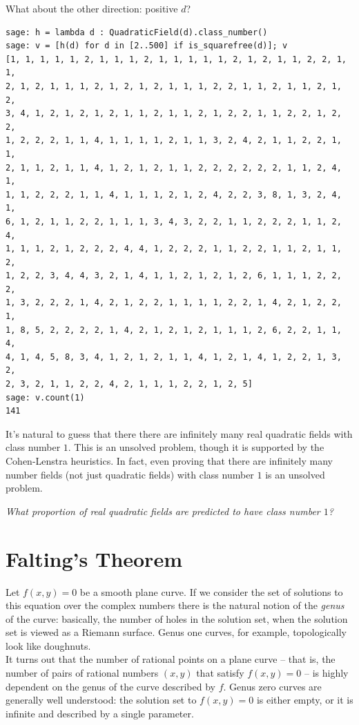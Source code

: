 \documentclass{book}
\theoremstyle{plain}
\theoremstyle{definition}
\numberwithin{equation}{section}
\numberwithin{figure}{section}
\numberwithin{table}{section}
\newcommand{\hw}[2]{\par\vspace{1em}{\bf HW (#1):} {\em #2}\par\vspace{1em}}
\begin{document}
What about the other direction: positive $d$?
\begin{lstlisting}
sage: h = lambda d : QuadraticField(d).class_number()
sage: v = [h(d) for d in [2..500] if is_squarefree(d)]; v
[1, 1, 1, 1, 1, 2, 1, 1, 1, 2, 1, 1, 1, 1, 1, 2, 1, 2, 1, 1, 2, 2, 1, 1,
2, 1, 2, 1, 1, 1, 2, 1, 2, 1, 2, 1, 1, 1, 2, 2, 1, 1, 2, 1, 1, 2, 1, 2,
3, 4, 1, 2, 1, 2, 1, 2, 1, 1, 2, 1, 1, 2, 1, 2, 2, 1, 1, 2, 2, 1, 2, 2,
1, 2, 2, 2, 1, 1, 4, 1, 1, 1, 1, 2, 1, 1, 3, 2, 4, 2, 1, 1, 2, 2, 1, 1,
2, 1, 1, 2, 1, 1, 4, 1, 2, 1, 2, 1, 1, 2, 2, 2, 2, 2, 2, 1, 1, 2, 4, 1,
1, 1, 2, 2, 2, 1, 1, 4, 1, 1, 1, 2, 1, 2, 4, 2, 2, 3, 8, 1, 3, 2, 4, 1,
6, 1, 2, 1, 1, 2, 2, 1, 1, 1, 3, 4, 3, 2, 2, 1, 1, 2, 2, 2, 1, 1, 2, 4,
1, 1, 1, 2, 1, 2, 2, 2, 4, 4, 1, 2, 2, 2, 1, 1, 2, 2, 1, 1, 2, 1, 1, 2,
1, 2, 2, 3, 4, 4, 3, 2, 1, 4, 1, 1, 2, 1, 2, 1, 2, 6, 1, 1, 1, 2, 2, 2,
1, 3, 2, 2, 2, 1, 4, 2, 1, 2, 2, 1, 1, 1, 1, 2, 2, 1, 4, 2, 1, 2, 2, 1,
1, 8, 5, 2, 2, 2, 2, 1, 4, 2, 1, 2, 1, 2, 1, 1, 1, 2, 6, 2, 2, 1, 1, 4,
4, 1, 4, 5, 8, 3, 4, 1, 2, 1, 2, 1, 1, 4, 1, 2, 1, 4, 1, 2, 2, 1, 3, 2,
2, 3, 2, 1, 1, 2, 2, 4, 2, 1, 1, 1, 2, 2, 1, 2, 5]
sage: v.count(1)
141
\end{lstlisting}
It's natural to guess that there there are infinitely many
real quadratic fields with class number $1$.
This is an unsolved problem, though it is supported
by the Cohen-Lenstra heuristics.   In fact, even proving
that there are infinitely many number fields (not just quadratic
fields) with class number $1$ is an unsolved problem.

\hw{Volunteer}{What proportion of real quadratic fields are
predicted to have class number $1$?}

\section{Falting's Theorem}\label{sec:faltings}
Let $f(x,y)=0$ be a smooth plane curve. If we consider the set of solutions to this equation over the complex numbers there is the natural notion of the {\it genus} of the curve: basically, the number of holes in the solution set, when the solution set is viewed as a Riemann surface. Genus one curves, for example, topologically look like doughnuts. \\

It turns out that the number of rational points on a plane curve -- that is, the number of pairs of rational numbers $(x,y)$ that satisfy $f(x,y)=0$ -- is highly dependent on the genus of the curve described by $f$. Genus zero curves are generally well understood: the solution set to $f(x,y)=0$ is either empty, or it is infinite and described by a single parameter. \\
\end{document}

